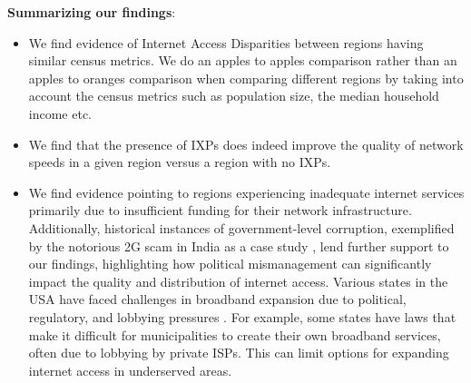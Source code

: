 \documentclass[conference]{IEEEtran}
\begin{document}
   \textbf{Summarizing our findings}:
   \begin{itemize}
        \item We find evidence of Internet Access Disparities between regions having similar census metrics. We do an apples to apples comparison rather than an apples to oranges comparison when comparing different regions by taking into account the census metrics such as population size, the median household income etc. 
        \item We find that the presence of IXPs does indeed improve the quality of network speeds in a given region versus a region with no IXPs.
        \item We find evidence pointing to regions experiencing inadequate internet services primarily due to insufficient funding for their network infrastructure. Additionally, historical instances of government-level corruption, exemplified by the notorious 2G scam in India as a case study \cite{7}, lend further support to our findings, highlighting how political mismanagement can significantly impact the quality and distribution of internet access. Various states in the USA have faced challenges in broadband expansion due to political, regulatory, and lobbying pressures \cite{8}. For example, some states have laws that make it difficult for municipalities to create their own broadband services, often due to lobbying by private ISPs. This can limit options for expanding internet access in underserved areas.
   \end{itemize}
\end{document}
